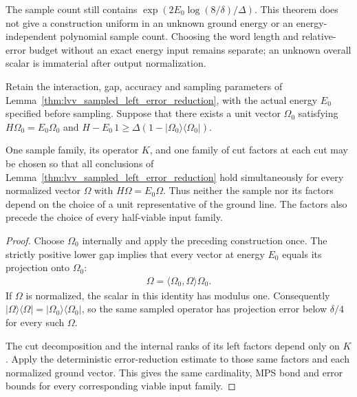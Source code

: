 The sample count still contains
$\exp(2E_0\log(8/\delta)/\Delta)$. This theorem does not give a construction
uniform in an unknown ground energy or an energy-independent polynomial
sample count. Choosing the word length and relative-error budget without
an exact energy input remains separate; an unknown overall scalar is
immaterial after output normalization.

\begin{lemma}
    \label{thm:lvv_sampled_ground_line_error_reduction}
    \leanok
    Retain the interaction, gap, accuracy and sampling parameters of
    Lemma~\ref{thm:lvv_sampled_left_error_reduction}, with the actual energy
    $E_0$ specified before sampling. Suppose that there exists a unit vector
    $\Omega_0$ satisfying
    $H\Omega_0=E_0\Omega_0$ and
    $H-E_0\,1\ge\Delta(1-|\Omega_0\rangle\langle\Omega_0|)$.

    One sample family, its operator $K$, and one family of cut factors at
    each cut may be chosen so that all conclusions of
    Lemma~\ref{thm:lvv_sampled_left_error_reduction} hold simultaneously
    for every normalized vector $\Omega$ with $H\Omega=E_0\Omega$.
    Thus neither the sample nor its factors depend on the choice of a unit
    representative of the ground line. The factors also precede the choice
    of every half-viable input family.
\end{lemma}
\begin{proof}\leanok
    Choose $\Omega_0$ internally and apply the preceding construction once.
    The strictly positive lower gap implies that every vector at energy
    $E_0$ equals its projection onto $\Omega_0$:
    \begin{align}
        \Omega=\langle\Omega_0,\Omega\rangle\Omega_0.
        \label{eq:lvv_sampled_ground_line_uniqueness}
    \end{align}
    If $\Omega$ is normalized, the scalar in this identity has modulus one.
    Consequently
    $|\Omega\rangle\langle\Omega|=|\Omega_0\rangle\langle\Omega_0|$,
    so the same sampled operator has projection error below $\delta/4$
    for every such $\Omega$.

    The cut decomposition and the internal ranks of its left factors depend
    only on $K$. Apply the deterministic error-reduction estimate to those
    same factors and each normalized ground vector. This gives the same
    cardinality, MPS bond and error bounds for every corresponding viable
    input family.
\end{proof}

